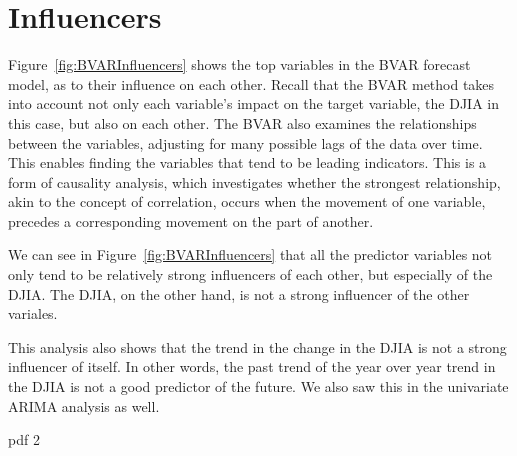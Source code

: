 \documentclass[12pt]{article}         %
\begin{document}
\section{Influencers}

Figure~\ref{fig:BVARInfluencers} shows the top variables in the BVAR forecast model, as to their influence on each other.  Recall that the BVAR method takes into account not only each variable's impact on the target variable, the DJIA in this case, but also on each other.  The BVAR also examines the relationships between the variables, adjusting for many possible lags of the data over time.  This enables finding the variables that tend to be leading indicators.  This is a form of causality analysis, which investigates whether the strongest relationship, akin to the concept of correlation, occurs when the movement of one variable, precedes a corresponding movement on the part of another.

We can see in Figure~\ref{fig:BVARInfluencers} that all the predictor variables not only tend to be relatively strong influencers of each other, but especially of the DJIA.  The DJIA, on the other hand, is not a strong influencer of the other variales.  

This analysis also shows that the trend in the change in the DJIA is not a strong influencer of itself.  In other words, the past trend of the year over year trend in the DJIA is not a good predictor of the future.  We also saw this in the univariate ARIMA analysis as well.

\begin{Schunk}
\begin{Soutput}
pdf 
  2 
\end{Soutput}
\end{Schunk}
\end{document}
